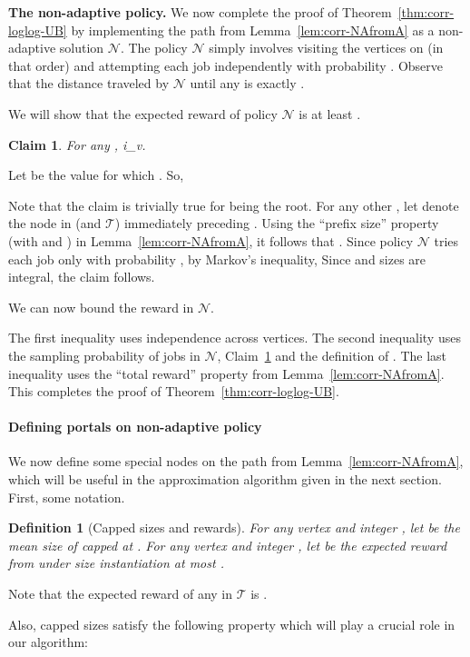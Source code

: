 \documentclass[11pt,letterpaper]{article}
\newtheorem{definition}[theorem]{Definition}
\newtheorem{claim}[theorem]{Claim}
\numberwithin{algorithm}{section}
\newenvironment{proof}{

\noindent{\bf Proof:}}
{\hfill


}
\newcommand{\N}[0]{{\ensuremath{\mathcal{N}}}\xspace}
\newcommand{\T}{\ensuremath{\mathcal{T}}\xspace}
\begin{document}
{\bf The non-adaptive policy.} We now complete the proof of Theorem~\ref{thm:corr-loglog-UB} by implementing the path  from Lemma~\ref{lem:corr-NAfromA} as a non-adaptive solution \N. The policy \N simply involves visiting the vertices on  (in that order) and attempting each job independently with probability . Observe that the distance traveled by \N until any  is exactly .

We will show that the expected reward of policy \N is at least .

\begin{claim}\label{cl:corr-NA}
For any , \le i_v.
\end{claim}
\begin{proof}
Let  be the value for which . So,


Note that the claim is trivially true for  being the root. For any other , let  denote the node in  (and \T) immediately preceding .
Using the ``prefix size'' property  (with  and ) in Lemma~\ref{lem:corr-NAfromA}, it follows that . Since policy \N tries each job only with probability ,  by Markov's inequality,
 Since  and sizes are integral, the claim follows.
\end{proof}
We can now bound the reward in \N.

The first inequality uses independence across vertices. The second inequality uses the sampling probability of jobs in \N, Claim~\ref{cl:corr-NA} and the definition of . The last inequality uses the ``total reward'' property from Lemma~\ref{lem:corr-NAfromA}. This completes the proof of Theorem~\ref{thm:corr-loglog-UB}.

\paragraph{Defining portals on non-adaptive policy}
We now define some special nodes on the path  from Lemma~\ref{lem:corr-NAfromA}, which will be useful in the approximation algorithm given in the next section. First, some notation.
\begin{definition}[Capped sizes and rewards]\label{def:cap-size-rew}
For any vertex  and integer , let  be the mean size of  capped at . For any vertex  and integer , let  be the expected reward from  under size instantiation at most .
\end{definition}

Note that the expected reward of any  in \T is .

Also, capped sizes satisfy the following property which will play a crucial role  in our algorithm:
\end{document}
